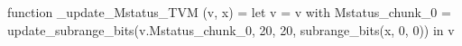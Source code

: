 function _update_Mstatus_TVM (v, x) = let v = { v with Mstatus_chunk_0 = update_subrange_bits(v.Mstatus_chunk_0, 20, 20, subrange_bits(x, 0, 0)) } in
  v
